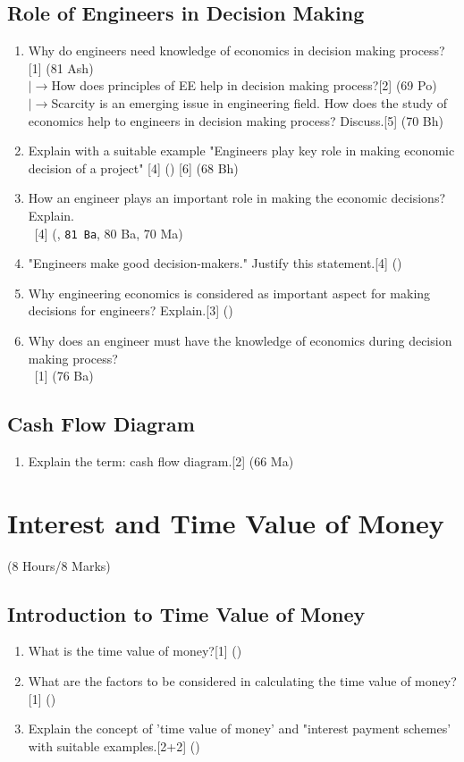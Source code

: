 \documentclass[12pt]{article}
\newcommand{\lb}{\\ $\left|\rightarrow\right.$}
\newcommand{\enter}{\\\textcolor{white}{1}}
\begin{document}
	\subsection{Role of Engineers in Decision Making}
	\begin{enumerate}[noitemsep, topsep=0pt]
	\item Why do engineers need knowledge of economics in decision making process?\hfill[1] (81 Ash)
	\lb How does principles of EE help in decision making process?\hfill[2] (69 Po)
	\lb Scarcity is an emerging issue in engineering field. How does the study of economics help to engineers in decision making process? Discuss.\hfill[5] (70 Bh)

	\item Explain with a suitable example "Engineers play key role in making economic decision of a project" \hfill[4] () [6] (68 Bh)

	\item How an engineer plays an important role in making the economic decisions? Explain.
	\enter\hfill[4] (, \texttt{81 Ba}, 80 Ba, 70 Ma)
	\item "Engineers make good decision-makers." Justify this statement.\hfill[4] ()
	\item Why engineering economics is considered as important aspect for making decisions for engineers? Explain.\hfill[3] ()
	\item Why does an engineer must have the knowledge of economics during decision making process?
	\enter\hfill[1] (76 Ba)
	\end{enumerate}
	\subsection{Cash Flow Diagram}
	\begin{enumerate}
	\item Explain the term: cash flow diagram.\hfill[2] (66 Ma)
	\end{enumerate}

	\pagebreak
\section{Interest and Time Value of Money}
	\begin{center}(8 Hours/8 Marks)\end{center}
	\subsection{Introduction to Time Value of Money}
	\begin{enumerate}
	\item What is the time value of money?\hfill[1] ()

	\item What are the factors to be considered in calculating the time value of money?\hfill[1] ()

	\item Explain the concept of 'time value of money' and "interest payment schemes' with suitable examples.\hspace{14.4cm}[2+2] ()
	\end{enumerate}
\end{document}
